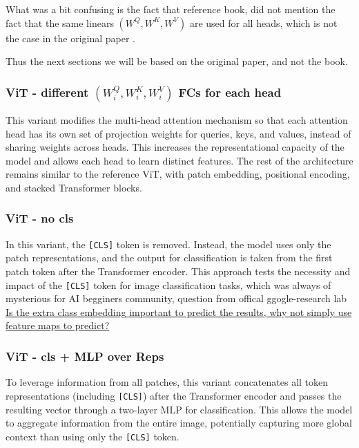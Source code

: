 What was a bit confusing is the fact that reference book, did not mention the fact that the same linears $(W^Q, W^K, W^V)$ are used for all heads, which is not the case in the original paper \cite{dosovitskiy2020image}.

Thus the next sections we will be based on the original paper, and not the book.




\subsubsection{ViT - different $(W^Q_i, W^K_i, W^V_i)$ FCs for each head}
This variant modifies the multi-head attention mechanism so that each attention head has its own set of projection weights for queries, keys, and values, instead of sharing weights across heads. This increases the representational capacity of the model and allows each head to learn distinct features. The rest of the architecture remains similar to the reference ViT, with patch embedding, positional encoding, and stacked Transformer blocks.

\subsubsection{ViT - no cls}
In this variant, the \texttt{[CLS]} token is removed. Instead, the model uses only the patch representations, and the output for classification is taken from the first patch token after the Transformer encoder. This approach tests the necessity and impact of the \texttt{[CLS]} token for image classification tasks, which was always of mysterious for AI begginers community, question from offical ggogle-research lab \href{https://github.com/google-research/vision_transformer/issues/61#issuecomment-802233921}{ Is the extra class embedding important to predict the results, why not simply use feature maps to predict?}

\subsubsection{ViT - cls + MLP over Reps}
To leverage information from all patches, this variant concatenates all token representations (including \texttt{[CLS]}) after the Transformer encoder and passes the resulting vector through a two-layer MLP for classification. This allows the model to aggregate information from the entire image, potentially capturing more global context than using only the \texttt{[CLS]} token.

